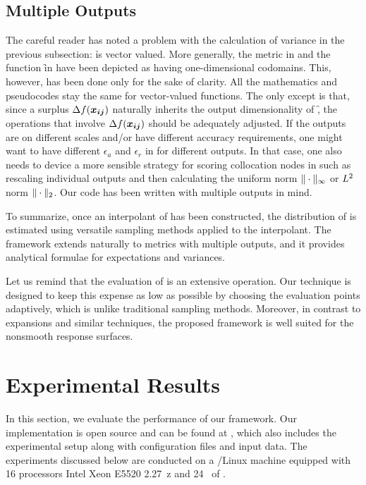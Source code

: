 \subsection{Multiple Outputs}

The careful reader has noted a problem with the calculation of variance in the
previous subsection: \h is vector valued. More generally, the metric \g in
 and the function \f in  have been depicted
as having one-dimensional codomains. This, however, has been done only for the
sake of clarity. All the mathematics and pseudocodes stay the same for
vector-valued functions. The only except is that, since a surplus
$\Delta\f(\vx_{\vi \vj})$ naturally inherits the output dimensionality of \f,
the operations that involve $\Delta\f(\vx_{\vi \vj})$ should be adequately
adjusted. If the outputs are on different scales and/or have different accuracy
requirements, one might want to have different $\epsilon_a$ and $\epsilon_r$ in
 for different outputs. In that case, one also needs to
device a more sensible strategy for scoring collocation nodes in 
such as rescaling individual outputs and then calculating the uniform norm
$\norm[\infty]{\cdot}$ or $\L{2}$ norm $\norm[2]{\cdot}$. Our code
\cite{sources} has been written with multiple outputs in mind.

To summarize, once an interpolant of \g has been constructed, the distribution
of \g is estimated using versatile sampling methods applied to the interpolant.
The framework extends naturally to metrics with multiple outputs, and it
provides analytical formulae for expectations and variances.

Let us remind that the evaluation of \g is an extensive operation. Our technique
is designed to keep this expense as low as possible by choosing the evaluation
points adaptively, which is unlike traditional sampling methods. Moreover, in
contrast to  expansions and similar techniques, the proposed framework is
well suited for the nonsmooth response surfaces.

\section{Experimental Results}

In this section, we evaluate the performance of our framework. Our
implementation is open source and can be found at \cite{sources}, which also
includes the experimental setup along with configuration files and input data.
The experiments discussed below are conducted on a /Linux machine
equipped with 16 processors Intel Xeon E5520 2.27~z and 24~ of
.

